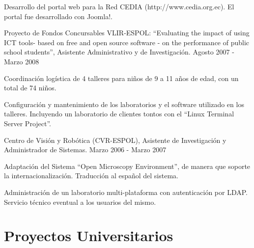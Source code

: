 \documentclass[a4paper]{article}
\renewenvironment{itemize}{
  \begin{list}{}{
    \setlength{\leftmargin}{1.5em}
  }
}{
  \end{list}
}
\begin{document}
\begin{itemize}
\begin{itemize}
      \item Desarrollo del portal web para la Red CEDIA (http://www.cedia.org.ec). El portal fue desarrollado con Joomla!.
    \end{itemize}
  \item Proyecto de Fondos Concursables VLIR-ESPOL: ``Evaluating the impact of using ICT tools- based on free and open source software - on the performance of public school students'', Asistente Administrativo y de Investigación. Agosto 2007 - Marzo 2008
    \begin{itemize}
      \item Coordinación logística de 4 talleres para niños de 9 a 11 años de edad, con un total de 74 niños.
      \item Configuración y mantenimiento de los laboratorios y el software utilizado en los talleres. Incluyendo un laboratorio de clientes tontos con el ``Linux Terminal Server Project''.
    \end{itemize}
  \item Centro de Visión y Robótica (CVR-ESPOL), Asistente de Investigación y Administrador de Sistemas. Marzo 2006 - Marzo 2007
    \begin{itemize}
      \item Adaptación del Sistema ``Open Microscopy Environment'', de manera que soporte la internacionalización. Traducción al español del sistema.
      \item Administración de un laboratorio multi-plataforma con autenticación por LDAP. Servicio técnico eventual a los usuarios del mismo. 
    \end{itemize}
\end{itemize}

\section*{Proyectos Universitarios}
\end{document}
